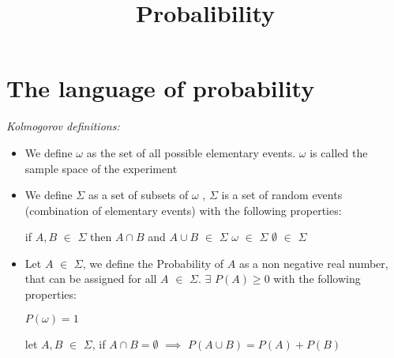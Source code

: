\documentclass[paper=9in:6in,pagesize=pdftex,headinclude=on,footinclude=on,10pt,bibtotoc,pointlessnumbers,normalheadings,DIV=9,twoside=false]{scrbook}
\title{Probalibility}
\begin{document}
\date{}

\maketitle

\section{ The language of probability \\} 

\begin{large} 
 \emph{Kolmogorov definitions:}
\end{large} 
\begin{itemize} 
\item We define $\omega$ as the set of all possible elementary events. $\omega$ is called the sample space of the experiment

\item We define $\Sigma$ as a set of subsets of $\omega$ , $\Sigma$ is a set of random events (combination of elementary events) with the following properties:

\subitem if  $A,B$ $\in$   $\Sigma$ then $A \cap  B$ and $A \cup B $ $\in$ $\Sigma$
\subitem $\omega$ $\in$ $\Sigma$
\subitem $\emptyset$ $\in$ $\Sigma$

\item Let $A$ $\in$ $\Sigma$, we define the Probability of $A$ as a non negative real number, that can be assigned for all $A$ $\in$ $\Sigma$. $\exists$ $P(A)$$\geq0 $ with the following properties:

\subitem $ P(\omega)=1$

\subitem  let $A,B$ $\in$   $\Sigma$, if $A \cap B = \emptyset$ $\implies$ $P(A\cup B) = P(A) + P(B) $



\end{itemize}
\end{document}
